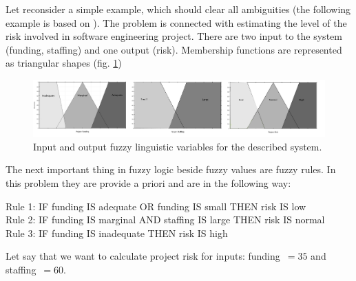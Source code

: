 Let reconsider a simple example, which should clear all ambiguities (the following 
example is based on \cite{bib0}). The problem is connected with estimating the
level of the risk involved in software engineering project. There are two input
to the system (funding, staffing) and one output
(risk). Membership functions are represented as triangular shapes (fig. \ref{fig:fuzzy_example_1}) 
\begin{figure}[H]
    \begin{center}
        \includegraphics[width=\textwidth]{fig/fuzzy_example_1.png}
    \end{center}
    \caption{Input and output fuzzy linguistic variables for the described
    system.}
    \label{fig:fuzzy_example_1}
\end{figure}
The next important thing in fuzzy logic beside fuzzy values are fuzzy rules. In
this problem they are provide a priori and are in the following way:
\begin{table}[H]
    Rule 1: IF funding IS adequate OR funding IS small THEN risk IS
    low \\
    Rule 2: IF funding IS marginal AND staffing IS large THEN risk IS
    normal \\
    Rule 3: IF funding IS inadequate THEN risk IS high
\end{table}
Let say that we want to calculate project risk for inputs: funding~$=35$ and
staffing~$=60$. 
